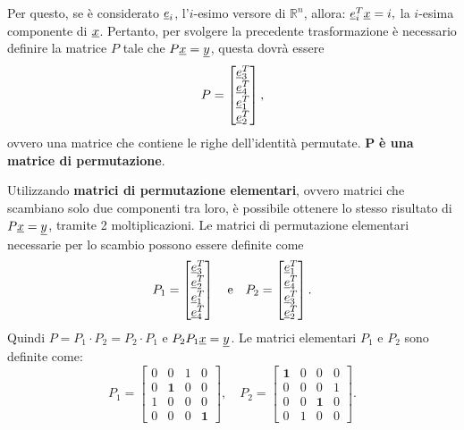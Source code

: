 Per questo, se è considerato $\uline e_i$, l'$i$-esimo versore di $\mathbb R^n$, allora: $\uline e_i^T\uline x=i,$ la $i$-esima componente di $\uline x$. Pertanto, per svolgere la precedente trasformazione è necessario definire la matrice $P$ tale che $P\uline x=\uline y$, questa dovrà essere
\begin{equation*}
    P=\begin{bmatrix}
        \uline e_3^T\\
        \uline e_4^T\\
        \uline e_1^T\\
        \uline e_2^T
    \end{bmatrix},
\end{equation*}
ovvero una matrice che contiene le righe dell'identità permutate. $\boldsymbol P$ \textbf{è una matrice di permutazione}.

Utilizzando \textbf{matrici di permutazione elementari}, ovvero matrici che scambiano solo due componenti tra loro, è possibile ottenere lo stesso risultato di $P\uline x=\uline y$, tramite 2 moltiplicazioni. Le matrici di permutazione elementari necessarie per lo scambio possono essere definite come
\begin{equation*}
    P_1=
    \begin{bmatrix}
        \uline e_3^T\\
        \uline e_2^T\\
        \uline e_1^T\\
        \uline e_4^T
    \end{bmatrix}\quad\text{e}\quad
    P_2=
    \begin{bmatrix}
        \uline e_1^T\\
        \uline e_4^T\\
        \uline e_3^T\\
        \uline e_2^T
    \end{bmatrix}.
\end{equation*}
Quindi $P=P_1\cdot P_2=P_2\cdot P_1$ e $P_2P_1\uline x=\uline y$. Le matrici elementari $P_1$ e $P_2$ sono definite come:
\begin{equation*}
    P_1 =
    \begin{bmatrix}
        0 & 0 & \boxed{1} & 0\\
        0 & \boldsymbol 1 & 0 & 0 \\
        \boxed{1} & 0 & 0 & 0 \\
        0 & 0 & 0 &\boldsymbol 1
    \end{bmatrix},\quad
    P_2 =
    \begin{bmatrix}
        \boldsymbol 1 & 0 & 0 & 0\\
        0 & 0 & 0 & \boxed{1}\\
        0 & 0 & \boldsymbol 1 & 0\\
        0 & \boxed{1} & 0 & 0
    \end{bmatrix}.
\end{equation*}

